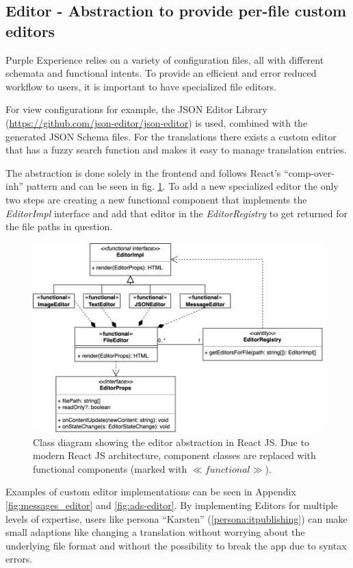 \subsection{Editor - Abstraction to provide per-file custom editors}

Purple Experience relies on a variety of configuration files, all with different schemata and functional intents.
To provide an efficient and error reduced workflow to users, it is important to have specialized file editors.

For view configurations for example, the JSON Editor Library (\url{https://github.com/json-editor/json-editor}) is used, combined with the generated JSON Schema files. For the translations there exists a custom editor that has a fuzzy search function and makes it easy to manage translation entries.

The abstraction is done solely in the frontend and follows React's ``\Gls{comp-over-inh}'' pattern and can be seen in fig. \ref{fig:abstract-editor}.
To add a new specialized editor the only two steps are creating a new functional component that implements the \textit{EditorImpl} interface
and add that editor in the \textit{EditorRegistry} to get returned for the file paths in question.
\begin{figure}[h!]
  \includegraphics[width=\textwidth]{pics/abstract_editor_uml.drawio.png}
  \caption{Class diagram showing the editor abstraction in React JS. Due to modern React JS architecture, component classes are replaced with functional components (marked with $\ll functional\gg$).}
  \label{fig:abstract-editor}
\end{figure}
Examples of custom editor implementations can be seen in Appendix \ref{fig:messages_editor} and \ref{fig:ads-editor}.
By implementing Editors for multiple levels of expertise, users like persona ``Karsten'' (\ref{persona:itpublishing}) can make small adaptions like changing a translation without worrying about the underlying file format and without the possibility to break the app due to syntax errors.

